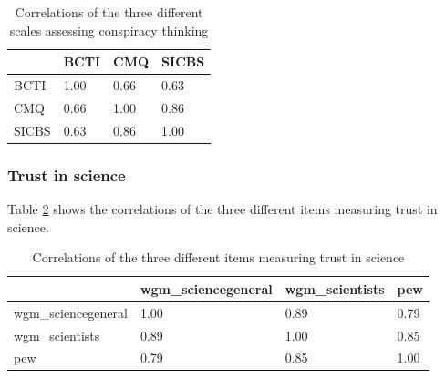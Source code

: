 \documentclass[
  doc,floatsintext]{apa6}
\begin{document}
\begin{table}[h]

\begin{center}
\begin{threeparttable}

\caption{\label{tab:exp2-correlation-conspiracy}Correlations of the three different scales assessing conspiracy thinking}

\begin{tabular}{llll}
\toprule
 & \multicolumn{1}{c}{BCTI} & \multicolumn{1}{c}{CMQ} & \multicolumn{1}{c}{SICBS}\\
\midrule
BCTI & 1.00 & 0.66 & 0.63\\
CMQ & 0.66 & 1.00 & 0.86\\
SICBS & 0.63 & 0.86 & 1.00\\
\bottomrule
\end{tabular}

\end{threeparttable}
\end{center}

\end{table}

\subsubsection{Trust in science}\label{trust-in-science-4}

Table \ref{tab:exp2-correlation-trust} shows the correlations of the three different items measuring trust in science.

\begin{table}[h]

\begin{center}
\begin{threeparttable}

\caption{\label{tab:exp2-correlation-trust}Correlations of the three different items measuring trust in science}

\begin{tabular}{llll}
\toprule
 & \multicolumn{1}{c}{wgm\_sciencegeneral} & \multicolumn{1}{c}{wgm\_scientists} & \multicolumn{1}{c}{pew}\\
\midrule
wgm\_sciencegeneral & 1.00 & 0.89 & 0.79\\
wgm\_scientists & 0.89 & 1.00 & 0.85\\
pew & 0.79 & 0.85 & 1.00\\
\bottomrule
\end{tabular}

\end{threeparttable}
\end{center}

\end{table}
\end{document}

